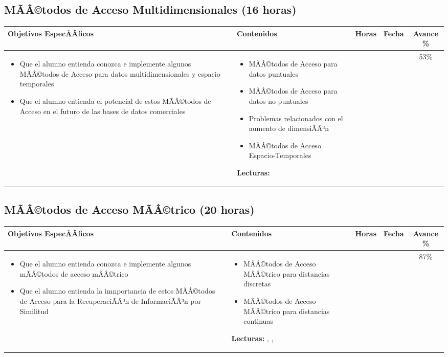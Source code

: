 \documentclass[a4paper]{article}
\newenvironment{unitgoals}
{ \begin{itemize} }
{ \end{itemize}   }
\newenvironment{topics}
{ \begin{itemize} }
{ \end{itemize}   }
\begin{document}
\subsection{MÃÂ©todos de Acceso Multidimensionales (16 horas)}
\begin{tabularx}{\textwidth}{|X|X|c|c|c|}
\hline
\textbf{Objetivos EspecÃÂ­ficos} &   \textbf{Contenidos} & \textbf{Horas} & \textbf{Fecha} & \textbf{Avance \%}  \\ \hline
\begin{unitgoals}
         \item Que el alumno entienda conozca e implemente algunos MÃÂ©todos de Acceso para datos multidimensionales y espacio temporales
         \item Que el alumno entienda el potencial de estos MÃÂ©todos de Acceso en el futuro de las bases de datos comerciales
   \end{unitgoals}      &
\begin{topics}
         \item MÃÂ©todos de Acceso para datos puntuales
         \item MÃÂ©todos de Acceso para datos no puntuales
         \item Problemas relacionados con el aumento de dimensiÃÂ³n
         \item MÃÂ©todos de Acceso Espacio-Temporales
   \end{topics}
{\bf Lecturas:} \cite{Gaede98multidimensional} &
&
&
53\%
\\
\hline
\end{tabularx}

\subsection{MÃÂ©todos de Acceso MÃÂ©trico (20 horas)}
\begin{tabularx}{\textwidth}{|X|X|c|c|c|}
\hline
\textbf{Objetivos EspecÃÂ­ficos} &   \textbf{Contenidos} & \textbf{Horas} & \textbf{Fecha} & \textbf{Avance \%}  \\ \hline
\begin{unitgoals}
         \item Que el alumno entienda conozca e implemente algunos mÃÂ©todos de acceso mÃÂ©trico
         \item Que el alumno entienda la imnportancia de estos MÃÂ©todos de Acceso para la RecuperaciÃÂ³n de InformaciÃÂ³n por Similitud
   \end{unitgoals}      &
\begin{topics}
         \item MÃÂ©todos de Acceso MÃÂ©trico para distancias discretas
         \item MÃÂ©todos de Acceso MÃÂ©trico para distancias continuas
   \end{topics}
{\bf Lecturas:} \cite{Chavez:01}, \cite{Traina00SlimTree}, \cite{Zezula07} &
&
&
87\%
\\
\hline
\end{tabularx}
\end{document}
